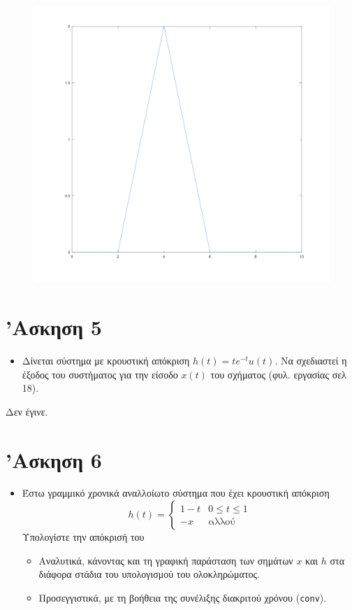 \documentclass{article}
\begin{document}
\begin{figure}[H]
	\centering
	\includegraphics[width=\linewidth]{res/fig4.png}
\end{figure}

\section{'Ασκηση 5}

\begin{itemize}
	\item Δίνεται σύστημα με κρουστική απόκριση $h(t) = te^{-t}u(t)$. Να
		σχεδιαστεί η έξοδος του συστήματος για την είσοδο $x(t)$
		του σχήματος (φυλ. εργασίας σελ 18).
\end{itemize}

Δεν έγινε.

\section{'Ασκηση 6}

\begin{itemize}
        \item Έστω γραμμικό χρονικά αναλλοίωτο σύστημα που έχει κρουστική
		απόκριση
		\[
			h(t) = 
			\left\{
				\begin{array}{ll}
				1-t  & 0 \leq t \leq 1 \\
				-x & \mbox{αλλού}
			\end{array}
			\right.
		\]
		Υπολογίστε την απόκρισή του
		\begin{itemize}
			\item Αναλυτικά, κάνοντας και τη γραφική παράσταση
				των σημάτων $x$ και $h$ στα διάφορα στάδια του
				υπολογισμού του ολοκληρώματος.
			\item Προσεγγιστικά, με τη βοήθεια της συνέλιξης
				διακριτού χρόνου (\lstinline{conv}).
		\end{itemize}
\end{itemize}
\end{document}
